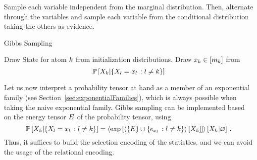 Sample each variable independent from the marginal distribution.
Then, alternate through the variables and sample each variable from the conditional distribution taking the others as evidence.

\begin{algorithm}[hbt!]
\caption{Gibbs Sampling}\label{alg:Gibbs}
\begin{algorithmic}
\For{$\atomenumeratorin$}
	\State Draw State for atom $k$ from initialization distributions. %
\EndFor
{}
\For{$\atomenumeratorin$}
	\State Draw $x_{k}\in[m_{k}]$ from 
		\[ \mathbb{P}\left[X_{k}|\{X_{l}=x_{l} \, : l \neq k\}\right] \]
\EndFor
\EndWhile
\end{algorithmic}
\end{algorithm}


Let us now interpret a probability tensor at hand as a member of an exponential family (see Section~\ref{sec:exponentialFamilies}), which is always possible when taking the naive exponential family.
Gibbs sampling can be implemented based on the energy tensor $E$ of the probability tensor, using
	\[ \mathbb{P}\left[X_{k}|\{X_{l}=x_{l} \, : l \neq k\}\right] = \left\langle \mathrm{exp}\left[\left\langle \{E\}\cup\{e_{x_{l}} \, : l \neq k \}\right\rangle \left[ X_{k} \right]\right]\right\rangle \left[ X_{k} | \varnothing \right]  \, .\]
Thus, it suffices to build the selection encoding of the statistics, and we can avoid the usage of the relational encoding.










